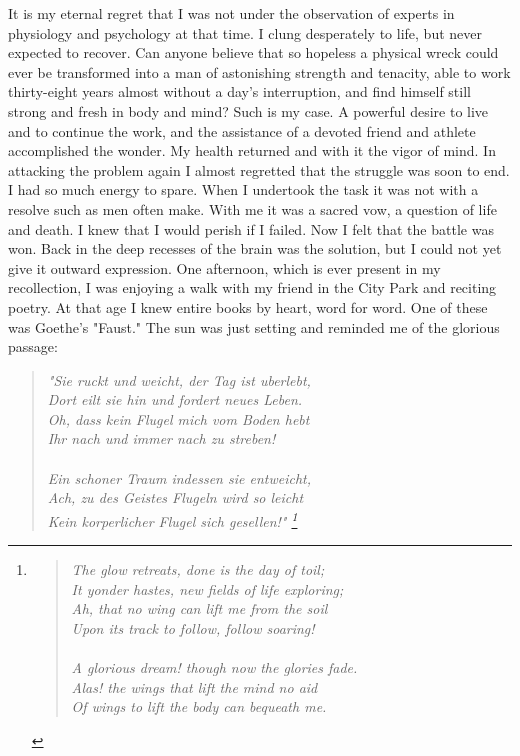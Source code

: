 \documentclass[a4paper,12pt,english,twoside,openright]{memoir}
\begin{document}
It is my eternal regret that I was not under the observation of experts in physiology and 
psychology at that time.  I clung desperately to life, but never expected to recover.  Can anyone 
believe that so hopeless a physical wreck could ever be transformed into a man of astonishing 
strength and tenacity, able to work thirty-eight years almost without a day's interruption, and find 
himself still strong and fresh in body and mind? Such is my case.  A powerful desire to live and to 
continue the work, and the assistance of a devoted friend and athlete accomplished the wonder.  
My health returned and with it the vigor of mind.  In attacking the problem again I almost regretted 
that the struggle was soon to end.  I had so much energy to spare.  When I undertook the task it 
was not with a resolve such as men often make.  With me it was a sacred vow, a question of life 
and death.  I knew that I would perish if I failed.  Now I felt that the battle was won.  Back in the 
deep recesses of the brain was the solution, but I could not yet give it outward expression.  One 
afternoon, which is ever present in my recollection, I was enjoying a walk with my friend in the 
City Park and reciting poetry.  At that age I knew entire books by heart, word for word.  One of 
these was Goethe's "Faust." The sun was just setting and reminded me of the glorious passage:
\begin{verse}\itshape 
"Sie ruckt und weicht, der Tag ist uberlebt,\\ 
Dort eilt sie hin und fordert neues Leben.\\
Oh, dass kein Flugel mich vom Boden hebt\\
Ihr nach und immer nach zu streben!\\
{\hspace{7em} \Asterisk\hspace{1em} \Asterisk\hspace{1em} \Asterisk \\}
Ein schoner Traum indessen sie entweicht,\\
Ach, zu des Geistes Flugeln wird so leicht\\
Kein korperlicher Flugel sich gesellen!"
\footnote{\vspace{-2em}
	\begin{verse}\itshape
		The glow retreats, done is the day of toil;\\
		It yonder hastes, new fields of life exploring;\\
		Ah, that no wing can lift me from the soil\\
		Upon its track to follow, follow soaring!\\
		{\hspace{5em} \Asterisk\hspace{1em} \Asterisk\hspace{1em} \Asterisk \\}
		A glorious dream! though now the glories fade.\\
		Alas! the wings that lift the mind no aid\\
		Of wings to lift the body can bequeath me.
	\end{verse}
}		
\end{verse}
\end{document}
